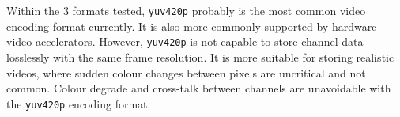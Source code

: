 Within the 3 formats tested, \texttt{yuv420p} probably is the most common video encoding format currently. It is also more commonly supported by hardware video accelerators. However, \texttt{yuv420p} is not capable to store channel data losslessly with the same frame resolution. It is more suitable for storing realistic videos, where sudden colour changes between pixels are uncritical and not common. Colour degrade and cross-talk between channels are unavoidable with the \texttt{yuv420p} encoding format.


